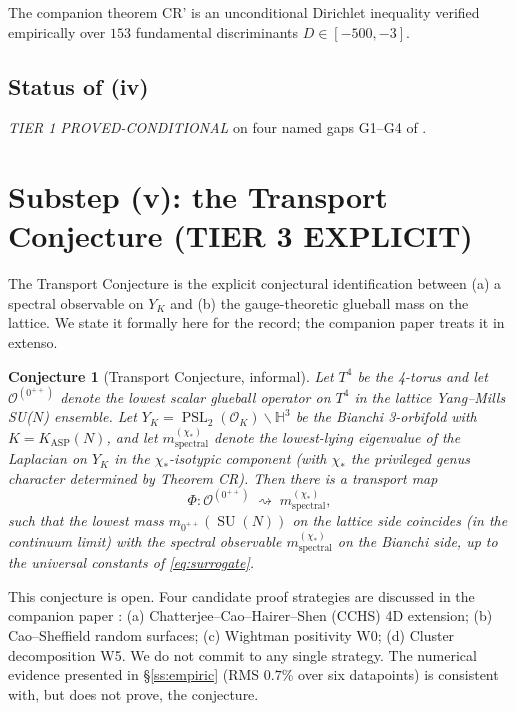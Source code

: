 \documentclass[11pt,a4paper,reqno]{amsart}
\newtheorem{conjecture}[theorem]{Conjecture}
\theoremstyle{definition}
\DeclareMathOperator{\PSL}{PSL}
\DeclareMathOperator{\SU}{SU}
\newcommand{\OK}{\mathcal{O}_K}
\newcommand{\YK}{Y_K}
\newcommand{\KASP}{K_{\mathrm{ASP}}}
\newcommand{\HH}{\mathbb{H}}
\begin{document}
The companion theorem CR' is an unconditional Dirichlet inequality verified
empirically over $153$ fundamental discriminants $D\in[-500,-3]$.

\subsection*{Status of (iv)} \emph{TIER 1 PROVED-CONDITIONAL} on four named
gaps G1--G4 of \cite{Remondiere2026CenterRank}.

\section{Substep (v): the Transport Conjecture (TIER 3 EXPLICIT)}\label{sec:transport}

The Transport Conjecture is the explicit conjectural identification between (a) a spectral observable on $\YK$ and (b) the gauge-theoretic glueball mass on the lattice. We state it formally here for the record; the companion paper \cite{Remondiere2026Transport} treats it in extenso.

\begin{conjecture}[Transport Conjecture, informal]\label{conj:transport}
Let $T^4$ be the 4-torus and let $\mathcal{O}^{(0^{++})}$ denote the lowest scalar glueball operator on $T^4$ in the lattice Yang--Mills SU($N$) ensemble. Let $\YK = \PSL_2(\OK)\backslash\HH^3$ be the Bianchi 3-orbifold with $K = \KASP(N)$, and let $m^{(\chi_*)}_{\mathrm{spectral}}$ denote the lowest-lying eigenvalue of the Laplacian on $\YK$ in the $\chi_*$-isotypic component (with $\chi_*$ the privileged genus character determined by Theorem CR). Then there is a transport map
\[
   \Phi : \mathcal{O}^{(0^{++})} \;\rightsquigarrow\; m^{(\chi_*)}_{\mathrm{spectral}},
\]
such that the lowest mass $m_{0^{++}}(\SU(N))$ on the lattice side coincides (in the continuum limit) with the spectral observable $m^{(\chi_*)}_{\mathrm{spectral}}$ on the Bianchi side, up to the universal constants of \eqref{eq:surrogate}.
\end{conjecture}

This conjecture is open. Four candidate proof strategies are discussed in the companion paper \cite{Remondiere2026Transport}: (a) Chatterjee--Cao--Hairer--Shen (CCHS) 4D extension; (b) Cao--Sheffield random surfaces; (c) Wightman positivity W0; (d) Cluster decomposition W5. We do not commit to any single strategy. The numerical evidence presented in \S\ref{ss:empiric} (RMS $0.7\%$ over six datapoints) is consistent with, but does not prove, the conjecture.
\end{document}
